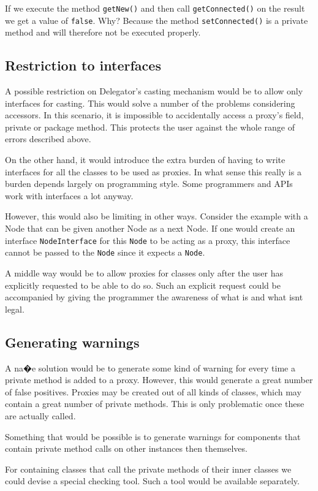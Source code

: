 \documentclass[a4paper,12pt]{book}
\begin{document}
If we execute the method \verb|getNew()| and then call \verb|getConnected()| on the result we get a value of \verb|false|. Why? Because the method \verb|setConnected()| is a private method and will therefore not be executed properly.

\subsection*{Restriction to interfaces}
A possible restriction on Delegator's casting mechanism would be to allow only interfaces for casting. This would solve a number of the problems considering accessors. In this scenario, it is impossible to accidentally access a proxy's field, private or package method. This protects the user against the whole range of errors described above. 

On the other hand, it would introduce the extra burden of having to write interfaces for all the classes to be used as proxies. In what sense this really is a burden depends largely on programming style. Some programmers and APIs work with interfaces a lot anyway.

However, this would also be limiting in other ways. Consider the example with a Node that can be given another Node as a next Node. If one would create an interface \verb|NodeInterface| for this \verb|Node| to be acting as a proxy, this interface cannot be passed to the \verb|Node| since it expects a \verb|Node|.

A middle way would be to allow proxies for classes only after the user has explicitly requested to be able to do so. Such an explicit request could be accompanied by giving the programmer the awareness of what is and what isnt legal.

\subsection*{Generating warnings}
A na�e solution would be to generate some kind of warning for every time a private method is added to a proxy. However, this would generate a great number of false positives. Proxies may be created out of all kinds of classes, which may contain a great number of private methods. This is only problematic once these are actually called.

Something that would be possible is to generate warnings for components that contain private method calls on other instances then themselves.

For containing classes that call the private methods of their inner classes we could devise a special checking tool. Such a tool would be available separately.
\end{document}
